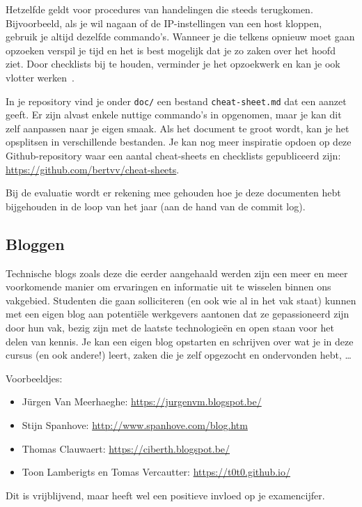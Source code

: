 Hetzelfde geldt voor procedures van handelingen die steeds terugkomen.  Bijvoorbeeld, als je wil nagaan of de IP-instellingen van een host kloppen, gebruik je altijd dezelfde commando's. Wanneer je die telkens opnieuw moet gaan opzoeken verspil je tijd en het is best mogelijk dat je zo zaken over het hoofd ziet. Door checklists bij te houden, verminder je het opzoekwerk en kan je ook vlotter werken~\autocite{Simmons2009}.

In je repository vind je onder \texttt{doc/} een bestand \texttt{cheat-sheet.md} dat een aanzet geeft. Er zijn alvast enkele nuttige commando's in opgenomen, maar je kan dit zelf aanpassen naar je eigen smaak. Als het document te groot wordt, kan je het opsplitsen in verschillende bestanden. Je kan nog meer inspiratie opdoen op deze Github-repository waar een aantal cheat-sheets en checklists gepubliceerd zijn: \url{https://github.com/bertvv/cheat-sheets}.

Bij de evaluatie wordt er rekening mee gehouden hoe je deze documenten hebt bijgehouden in de loop van het jaar (aan de hand van de commit log).

\subsection{Bloggen}
\label{subs:bloggen}

Technische blogs zoals deze die eerder aangehaald werden zijn een meer en meer voorkomende manier om ervaringen en informatie uit te wisselen binnen ons vakgebied. Studenten die gaan solliciteren (en ook wie al in het vak staat) kunnen met een eigen blog aan potentiële werkgevers aantonen dat ze gepassioneerd zijn door hun vak, bezig zijn met de laatste technologieën en open staan voor het delen van kennis. Je kan een eigen blog opstarten en schrijven over wat je in deze cursus (en ook andere!) leert, zaken die je zelf opgezocht en ondervonden hebt, \ldots

Voorbeeldjes:

\begin{itemize}
\item Jürgen Van Meerhaeghe: \url{https://jurgenvm.blogspot.be/}
\item Stijn Spanhove: \url{http://www.spanhove.com/blog.htm}
\item Thomas Clauwaert: \url{https://ciberth.blogspot.be/}
\item Toon Lamberigts en Tomas Vercautter: \url{https://t0t0.github.io/}
\end{itemize}

Dit is vrijblijvend, maar heeft wel een positieve invloed op je examencijfer.

